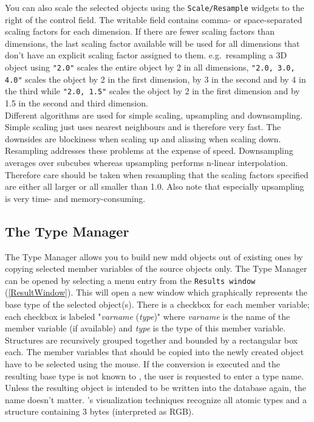 \documentclass[11pt]{article}
\begin{document}
You can also scale the selected objects using the \texttt{Scale/Resample} widgets to the
right of the control field. The writable field contains comma- or space-separated
scaling factors for each dimension. If there are fewer scaling factors than dimensions,
the last scaling factor available will be used for all dimensions that don't have
an explicit scaling factor assigned to them. e.g.\ resampling a 3D object using
\texttt{"2.0"} scales the entire object by 2 in all dimensions, \texttt{"2.0, 3.0, 4.0"}
scales the object by 2 in the first dimension, by 3 in the second and by 4 in the
third while  \texttt{"2.0, 1.5"} scales the object by 2 in the first dimension and
by 1.5 in the second and third dimension.\\
Different algorithms are used for simple scaling, upsampling and downsampling.
Simple scaling just uses nearest neighbours and is therefore very fast. The downsides
are blockiness when scaling up and aliasing when scaling down. Resampling addresses
these problems at the expense of speed. Downsampling averages over subcubes whereas
upsampling performs n-linear interpolation. Therefore care should be taken when
resampling that the scaling factors specified are either all larger or all smaller
than 1.0. Also note that especially upsampling is very time- and memory-consuming.

\subsection{The Type Manager} \label{TypeManager}

The Type Manager allows you to build new mdd objects out of existing ones by
copying selected member variables of the source objects only. The Type Manager
can be opened by selecting a menu entry from the \texttt{Results window}
(\ref{ResultWindow}). This will open a new window which graphically represents
the base type of the selected object(s). There is a checkbox for each member
variable; each checkbox is labeled "\textsl{varname} (\textsl{type})" where \textsl{varname}
is the name of the member variable (if available) and \textsl{type} is the type of
this member variable. Structures are recursively grouped together and bounded by
a rectangular box each. The member variables that should be copied into the
newly created object have to be selected using the mouse. If the conversion
is executed and the resulting base type is not known to \rview, the user is
requested to enter a type name. Unless the resulting object is intended to
be written into the database again, the name doesn't matter. \rview's visualization
techniques recognize all atomic types and a structure containing 3 bytes
(interpreted as RGB).
\end{document}
